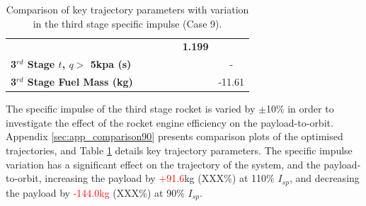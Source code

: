 \begin{table}[ht]
\begin{tabular}{l c c c c c c}
		& \textbf{\thirddExergyEffISPThreeNinetyFiveNoReturn}
		& \textbf{\thirddExergyEffISPThreeStandardNoReturn}
		& \textbf{\thirddExergyEffISPThreeOneHundredFiveNoReturn}
		& \textbf{\thirddExergyEffISPThreeOneHundredTenNoReturn}
		& \textbf{1.199}
		\\
		\textbf{3$^{rd}$ Stage $t$, $q >$ 5kpa (s)}
		& \thirdqOverFiveISPThreeNinetyNoReturn
		& \thirdqOverFiveISPThreeNinetyFiveNoReturn
		& \thirdqOverFiveISPThreeStandardNoReturn
		& \thirdqOverFiveISPThreeOneHundredFiveNoReturn
		& \thirdqOverFiveISPThreeOneHundredTenNoReturn
		& -
		\\
		\textbf{3$^{rd}$ Stage Fuel Mass (kg)}
		& \thirdmFuelISPThreeNinetyNoReturn
		& \thirdmFuelISPThreeNinetyFiveNoReturn
		& \thirdmFuelISPThreeStandardNoReturn
		& \thirdmFuelISPThreeOneHundredFiveNoReturn
		& \thirdmFuelISPThreeOneHundredTenNoReturn
		&-11.61
		\\
		\hline 
	\end{tabular} 
	\caption{Comparison of key trajectory parameters with variation in the third stage specific impulse (Case 9).}
	\label{tab:comparison90}
\end{table}

The specific impulse of the third stage rocket is varied by $\pm$10\% in order to investigate the effect of the rocket engine efficiency on the payload-to-orbit. Appendix \ref{sec:app_comparison90} presents comparison plots of the optimised trajectories, and Table \ref{tab:comparison90} details key trajectory parameters. 
The specific impulse variation has a significant effect on the trajectory of the system, and the payload-to-orbit, increasing the payload by \textcolor{red}{+91.6}kg (XXX\%) at 110\% $I_{sp}$, and decreasing the payload by \textcolor{red}{-144.0kg} (XXX\%) at 90\% $I_{sp}$. 

